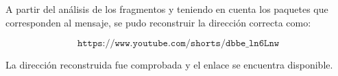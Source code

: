 \documentclass[11pt,a4paper]{article}
\begin{document}
\begin{enumerate}[label=\arabic*)]
\begin{enumerate}[label=\alph*)]
  A partir del análisis de los fragmentos y teniendo en cuenta los
  paquetes que corresponden al mensaje, se pudo reconstruir la dirección
  correcta como:

  \[
    \boxed{\texttt{https://www.youtube.com/shorts/dbbe\_ln6Lnw}}
  \]

  La dirección reconstruida fue comprobada y el enlace se encuentra
  disponible.


        \end{enumerate}
\end{enumerate}
\end{document}
